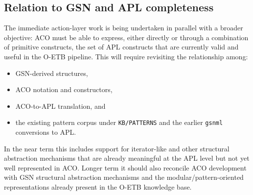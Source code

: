 \documentclass[12pt,twoside,a4paper]{article}
\begin{document}
\subsection{Relation to GSN and APL completeness}

The immediate action-layer work is being undertaken in parallel with a broader objective: ACO must be able to express, either directly or through a combination of primitive constructs, the set of APL constructs that are currently valid and useful in the O-ETB pipeline.
This will require revisiting the relationship among:
\begin{itemize}
  \item GSN-derived structures,
  \item ACO notation and constructors,
  \item ACO-to-APL translation, and
  \item the existing pattern corpus under \texttt{KB/PATTERNS} and the earlier \texttt{gsnml} conversions to APL.
\end{itemize}
In the near term this includes support for iterator-like and other structural abstraction mechanisms that are already meaningful at the APL level but not yet well represented in ACO.
Longer term it should also reconcile ACO development with GSN structural abstraction mechanisms and the modular/pattern-oriented representations already present in the O-ETB knowledge base.
\end{document}
